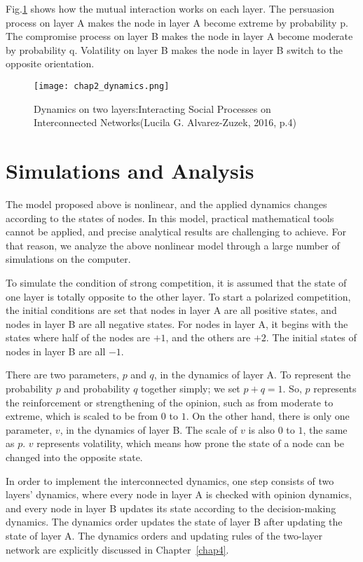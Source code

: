 Fig.\ref{chap2_dynamics} shows how the mutual interaction works on each layer. The persuasion process on layer A makes the node in layer A become extreme by probability p. The compromise process on layer B makes the node in layer A become moderate by probability q. Volatility on layer B makes the node in layer B switch to the opposite orientation.   

\begin{figure}[!htb]
	\centering
	\texttt{[image: chap2\_dynamics.png]}
	\caption{Dynamics on two layers:Interacting Social Processes on Interconnected Networks(Lucila G. Alvarez-Zuzek, 2016, p.4)}
	\label{chap2_dynamics}
\end{figure}

\section{Simulations and Analysis}
The model proposed above is nonlinear, and the applied dynamics changes according to the states of nodes. In this model, practical mathematical tools cannot be applied, and precise analytical results are challenging to achieve\parencite{nicolas2017, rainer2002}. For that reason, we analyze the above nonlinear model through a large number of simulations on the computer.

To simulate the condition of strong competition, it is assumed that the state of one layer is totally opposite to the other layer. To start a polarized competition, the initial conditions are set that nodes in layer A are all positive states, and nodes in layer B are all negative states. For nodes in layer A, it begins with the states where half of the nodes are $+1$, and the others are $+2$. The initial states of nodes in layer B are all $-1$.

There are two parameters, $p$ and $q$, in the dynamics of layer A. To represent the probability $p$ and probability $q$ together simply; we set $p+q=1$. So, $p$ represents the reinforcement or strengthening of the opinion, such as from moderate to extreme, which is scaled to be from $0$ to $1$. On the other hand, there is only one parameter, $v$, in the dynamics of layer B. The scale of $v$ is also $0$ to $1$, the same as $p$. $v$ represents volatility, which means how prone the state of a node can be changed into the opposite state.

In order to implement the interconnected dynamics, one step consists of two layers' dynamics, where every node in layer A is checked with opinion dynamics, and every node in layer B updates its state according to the decision-making dynamics. The dynamics order updates the state of layer B after updating the state of layer A. The dynamics orders and updating rules of the two-layer network are explicitly discussed in Chapter~\ref{chap4}.     

